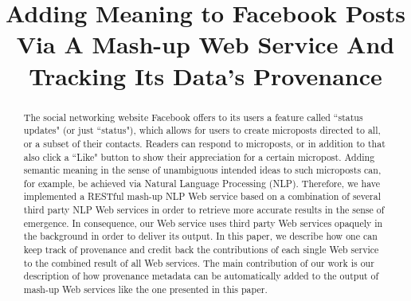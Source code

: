 \documentclass[conference]{IEEEtran}
\begin{document}
%
\title{Adding Meaning to Facebook Posts Via A Mash-up Web Service And Tracking Its Data's Provenance}

\author{
\and
{}
}

\maketitle

\begin{abstract}
The social networking website Facebook offers to its users a feature called ``status updates" (or just ``status"), which allows for users to create microposts directed to all, or a subset of their contacts. Readers can respond to microposts, or in addition to that also click a ``Like" button to show their appreciation for a certain micropost. Adding semantic meaning in the sense of unambiguous intended ideas to such microposts can, for example, be achieved via Natural Language Processing (NLP). Therefore, we have implemented a RESTful mash-up NLP Web service based on a combination of several third party NLP Web services in order to retrieve more accurate results in the sense of emergence. In consequence, our Web service uses third party Web services opaquely in the background in order to deliver its output. In this paper, we describe how one can keep track of provenance and credit back the contributions of each single Web service to the combined result of all Web services. The main contribution of our work is our description of how provenance metadata can be automatically added to the output of mash-up Web services like the one presented in this paper.
\end{abstract}

\IEEEpeerreviewmaketitle
\end{document}
